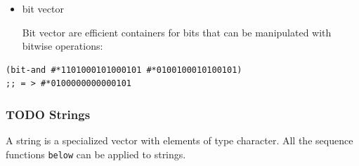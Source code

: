 \documentclass[11pt]{article}
\begin{document}
\begin{itemize}
\item bit vector

Bit vector are efficient containers for bits that can be
manipulated with bitwise operations:
\end{itemize}

\begin{verbatim}
(bit-and #*1101000101000101 #*0100100010100101)
;; = > #*0100000000000101
\end{verbatim}

\subsubsection{{\bfseries\sffamily TODO} Strings}
\label{sec-5-2-2}
A string is a specialized vector with elements of type
character. All the sequence functions \texttt{below} can be applied to
strings.
\end{document}
